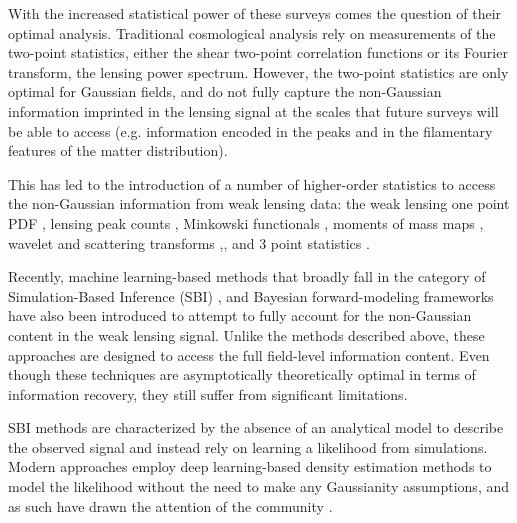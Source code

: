 \documentclass[twocolumn,twocolappendix]{aastex63}
\begin{document}
With the increased statistical power of these surveys comes the question of their optimal analysis. Traditional cosmological analysis rely on measurements of the two-point statistics, either the shear two-point correlation functions or its Fourier transform, the lensing power spectrum. However, the two-point statistics are only optimal for Gaussian fields, and do not fully capture the non-Gaussian information imprinted in the lensing signal at the scales that future surveys will be able to access (e.g. information encoded in the peaks and in the filamentary features of the matter distribution).

 This has led to the introduction of a number of  higher-order statistics to access the non-Gaussian information from weak lensing data: 
the weak lensing one point PDF \citep{liu2019constraining, uhlemann2020fisher, boyle2021nuw}, lensing peak counts \citep{liu2015cosmology, liu2015cosmological, lin2015new, kacprzak2016cosmology, peel2017cosmological, shan2018kids, martinet2018kids, ajani2020constraining, harnois2021cosmic, zurcher2022dark}, Minkowski functionals \citep{kratochvil2012probing, petri2013cosmology}, moments of mass maps \citep{gatti2021dark}, wavelet and scattering transforms \citep{ajani2021starlet, cheng2021weak},, and 3 point statistics \citep{takada2004cosmological, semboloni2011weak, rizzato2019tomographic, halder2021integrated}. 


Recently, machine learning-based methods that broadly fall in the category of Simulation-Based Inference (SBI) \citep{fluri2019cosmological, kacprzak2022deeplss, fluri2021cosmological, jeffrey2021likelihood, fluri2022full}, and Bayesian forward-modeling frameworks \citep{porqueres2021bayesian, sarma2022map} have also been introduced to attempt to fully account for the non-Gaussian content in the weak lensing signal. Unlike the methods described above, these approaches are designed to access the full field-level information content. Even though these techniques are asymptotically theoretically optimal in terms of information recovery, they still suffer from significant limitations.

SBI methods are characterized by the absence of an analytical model to describe the observed signal and instead rely on learning a likelihood from simulations. Modern approaches employ deep learning-based density estimation methods to model the likelihood without the need to make any Gaussianity assumptions, and as such have 
drawn the attention of the community \citep{alsing2018massive, jeffrey2021likelihood}.  
\end{document}
